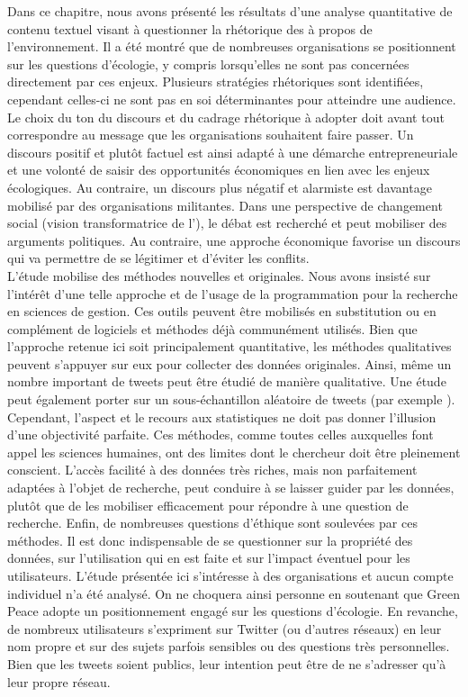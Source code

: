 Dans ce chapitre, nous avons présenté les résultats d'une analyse quantitative de contenu textuel visant à questionner la rhétorique des \eess à propos de l'environnement. Il a été montré que de nombreuses organisations se positionnent sur les questions d'écologie, y compris lorsqu'elles ne sont pas concernées directement par ces enjeux. Plusieurs stratégies rhétoriques sont identifiées, cependant celles-ci ne sont pas en soi déterminantes pour atteindre une audience. Le choix du ton du discours et du cadrage rhétorique à adopter doit avant tout correspondre au message que les organisations souhaitent faire passer. Un discours positif et plutôt factuel est ainsi adapté à une démarche entrepreneuriale et une volonté de saisir des opportunités économiques en lien avec les enjeux écologiques. Au contraire, un discours plus négatif et alarmiste est davantage mobilisé par des organisations militantes. Dans une perspective de changement social (vision transformatrice de l'\ess), le débat est recherché et peut mobiliser des arguments politiques. Au contraire, une approche économique favorise un discours qui va permettre de se légitimer et d'éviter les conflits. \\

    L'étude mobilise des méthodes nouvelles et originales. Nous avons insisté sur l'intérêt d'une telle approche et de l'usage de la programmation pour la recherche en sciences de gestion. Ces outils peuvent être mobilisés en substitution ou en complément de logiciels et méthodes déjà communément utilisés. Bien que l'approche retenue ici soit principalement quantitative, les méthodes qualitatives peuvent s'appuyer sur eux pour collecter des données originales. Ainsi, même un nombre important de tweets peut être étudié de manière qualitative. Une étude peut également porter sur un sous-échantillon aléatoire de tweets (par exemple \textcite{mariaux2017promouvoir}). Cependant, l'aspect  et le recours aux statistiques ne doit pas donner l'illusion d'une objectivité parfaite. Ces méthodes, comme toutes celles auxquelles font appel les sciences humaines, ont des limites dont le chercheur doit être pleinement conscient. L'accès facilité à des données très riches, mais non parfaitement adaptées à l'objet de recherche, peut conduire à se laisser guider par les données, plutôt que de les mobiliser efficacement pour répondre à une question de recherche. Enfin, de nombreuses questions d'éthique sont soulevées par ces méthodes. Il est donc indispensable de se questionner sur la propriété des données, sur l'utilisation qui en est faite et sur l'impact éventuel pour les utilisateurs. L'étude présentée ici s'intéresse à des organisations et aucun compte individuel n'a été analysé. On ne choquera  ainsi personne en soutenant que Green Peace adopte un positionnement engagé sur les questions d'écologie. En revanche, de nombreux utilisateurs s'expriment sur Twitter (ou d'autres réseaux) en leur nom propre et sur des sujets parfois sensibles ou des questions très personnelles. Bien que les tweets soient publics, leur intention peut être de ne s'adresser qu'à leur propre réseau. \\

